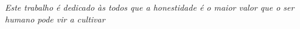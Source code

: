 \begin{dedicatoria}
   \vspace*{\fill}
   \centering
   \noindent

   \textit{Este trabalho é dedicado às todos que a honestidade é o maior valor que o ser humano pode vir a cultivar} \vspace*{\fill}
\end{dedicatoria}
